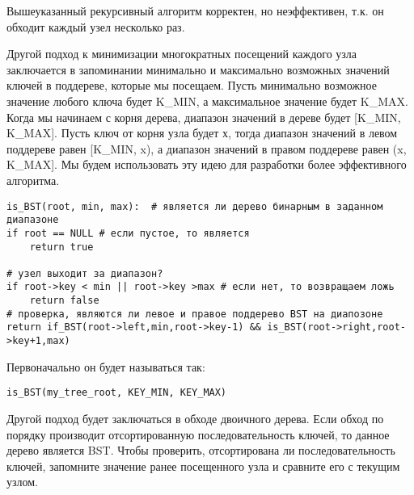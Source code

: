 \vspace{\baselineskip}
Вышеуказанный рекурсивный алгоритм корректен, но неэффективен, т.к. он обходит каждый узел несколько раз.

\vspace{\baselineskip}
Другой подход к минимизации многократных посещений каждого узла заключается в запоминании минимально и максимально возможных значений ключей в поддереве, которые мы посещаем. Пусть минимально возможное значение любого ключа будет K\_MIN, а максимальное значение будет K\_MAX. Когда мы начинаем с корня дерева, диапазон значений в дереве будет  [K\_MIN, K\_MAX]. Пусть ключ от корня узла будет х, тогда диапазон значений в левом поддереве равен [K\_MIN, x), а диапазон значений в правом поддереве равен (x, K\_MAX]. Мы будем использовать эту идею для разработки более эффективного алгоритма.

\vspace{\baselineskip}
\begin{tcolorbox}
\begin{verbatim}
is_BST(root, min, max):  # является ли дерево бинарным в заданном диапазоне
if root == NULL	# если пустое, то является
	return true

# узел выходит за диапазон?
if root->key < min || root->key >max # если нет, то возвращаем ложь
	return false
# проверка, являются ли левое и правое поддерево BST на диапозоне
return if_BST(root->left,min,root->key-1) && is_BST(root->right,root->key+1,max)

\end{verbatim}
\end{tcolorbox}

\vspace{\baselineskip}
Первоначально он будет называться так:

\vspace{\baselineskip}
\begin{tcolorbox}
\begin{verbatim}
is_BST(my_tree_root, KEY_MIN, KEY_MAX)
\end{verbatim}
\end{tcolorbox}

\vspace{\baselineskip}
Другой подход будет заключаться в обходе двоичного дерева. Если обход по порядку производит отсортированную последовательность ключей, то данное дерево является BST. Чтобы проверить, отсортирована ли последовательность ключей, запомните значение ранее посещенного узла и сравните его с текущим узлом.